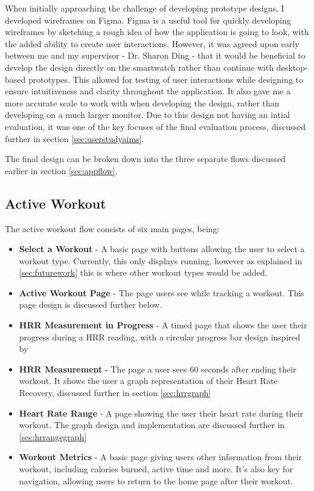\documentclass{l4proj}
\begin{document}
When initially approaching the challenge of developing prototype designs, I developed wireframes on Figma. Figma is a useful tool for quickly developing wireframes by sketching a rough idea of how the application is going to look, with the added ability to create user interactions. However, it was agreed upon early between me and my supervisor - Dr. Sharon Ding - that it would be beneficial to develop the design directly on the smartwatch rather than continue with desktop-based prototypes. This allowed for testing of user interactions while designing to ensure intuitiveness and clarity throughout the application. It also gave me a more accurate scale to work with when developing the design, rather than developing on a much larger monitor. Due to this design not having an intial evaluation, it was one of the key focuses of the final evaluation process, discussed further in section \ref{sec:userstudyaims}.

The final design can be broken down into the three separate flows discussed earlier in section \ref{sec:appflow}. 

\subsection{Active Workout}
\label{sec:activeworkout}

The active workout flow consists of six main pages, being:

\begin{itemize}
    \item \textbf{Select a Workout} - A basic page with buttons allowing the user to select a workout type. Currently, this only displays running, however as explained in \ref{sec:futurework} this is where other workout types would be added.
    \item \textbf{Active Workout Page} - The page users see while tracking a workout. This page design is discussed further below.
    \item \textbf{HRR Measurement in Progress} - A timed page that shows the user their progress during a HRR reading, with a circular progress bar design inspired by \cite{TicDesign}
    \item \textbf{HRR Measurement} - The page a user sees 60 seconds after ending their workout. It shows the user a graph representation of their Heart Rate Recovery, discussed further in section \ref{sec:hrrgraph}
    \item \textbf{Heart Rate Range} -  A page showing the user their heart rate during their workout. The graph design and implementation are discussed further in \ref{sec:hrrangegraph}
    \item \textbf{Workout Metrics} - A basic page giving users other information from their workout, including calories burned, active time and more. It’s also key for navigation, allowing users to return to the home page after their workout.
\end{itemize}
\end{document}

